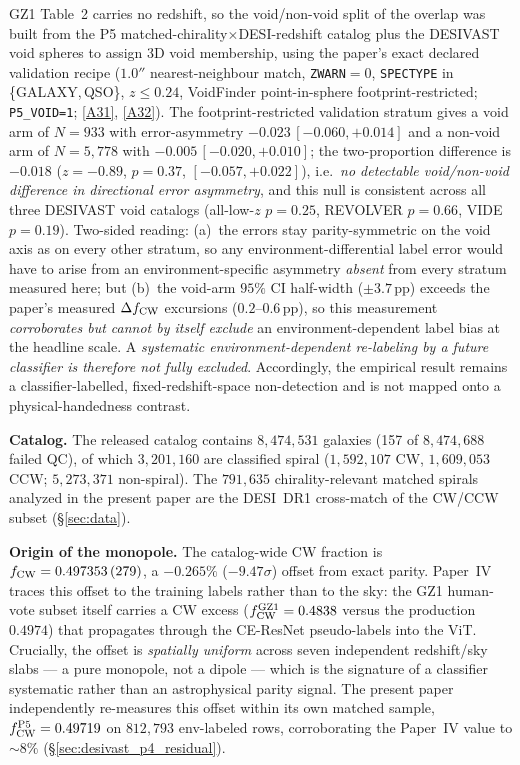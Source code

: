 \documentclass[twocolumn,linenumbers]{aastex702}
\newcommand{\repoBase}{https://github.com/Hubify-Projects/bigbounce/blob/main}
\begin{document}
GZ1 Table~2 carries no redshift, so the void/non-void split of the overlap
was built from the P5 matched-chirality$\times$DESI-redshift catalog plus the
DESIVAST void spheres to assign 3D void membership, using the paper's exact
declared validation recipe ($1.0''$ nearest-neighbour match, \texttt{ZWARN}$=0$,
\texttt{SPECTYPE} in \{GALAXY,\,QSO\}, $z\le0.24$, VoidFinder point-in-sphere
footprint-restricted; \texttt{P5\_VOID=1};
\href{\repoBase/pipelines/p2\_chirality/outputs/gz1\_stratified\_confusion.json}{[A31]},
\href{\repoBase/pipelines/p2\_chirality/scripts/gz1\_stratified\_confusion.py}{[A32]}).
The footprint-restricted validation stratum gives a void arm of $N=933$ with
error-asymmetry $-0.023\,[-0.060,+0.014]$ and a non-void arm of $N=5{,}778$
with $-0.005\,[-0.020,+0.010]$; the two-proportion difference is $-0.018$
($z=-0.89$, $p=0.37$, $[-0.057,+0.022]$), i.e.\ \emph{no detectable
void/non-void difference in directional error asymmetry}, and this null is
consistent across all three DESIVAST void catalogs (all-low-$z$ $p=0.25$,
REVOLVER $p=0.66$, VIDE $p=0.19$). Two-sided reading: (a)~the errors stay
parity-symmetric on the void axis as on every other stratum, so any
environment-differential label error would have to arise from an
environment-specific asymmetry \emph{absent} from every stratum measured
here; but (b)~the void-arm $95\%$ CI half-width ($\pm3.7$\,pp) exceeds the
paper's measured $\Delta f_{\rm CW}$ excursions ($0.2$--$0.6$\,pp), so this measurement
\emph{corroborates but cannot by itself exclude} an environment-dependent
label bias at the headline scale. A \emph{systematic
environment-dependent re-labeling by a future classifier is therefore
not fully excluded}. Accordingly, the empirical result remains a
classifier-labelled, fixed-redshift-space non-detection and is not mapped
onto a physical-handedness contrast.

\textbf{Catalog.} The released catalog contains $8{,}474{,}531$
galaxies (157 of $8{,}474{,}688$ failed QC), of which $3{,}201{,}160$
are classified spiral ($1{,}592{,}107$ CW, $1{,}609{,}053$ CCW;
$5{,}273{,}371$ non-spiral). The $791{,}635$ chirality-relevant matched
spirals analyzed in the present paper are the DESI~DR1 cross-match of
the CW/CCW subset (\S\ref{sec:data}).

\textbf{Origin of the monopole.} The catalog-wide CW fraction is
$f_{\rm CW}=0.497353\,(279)$, a $-0.265\%$ ($-9.47\sigma$) offset from
exact parity. Paper~IV traces this offset to the training labels rather
than to the sky: the GZ1 human-vote subset itself carries a CW excess
($f_{\rm CW}^{\rm GZ1}=0.4838$ versus the production $0.4974$) that
propagates through the CE-ResNet pseudo-labels into the ViT. Crucially,
the offset is \emph{spatially uniform} across seven independent
redshift/sky slabs --- a pure monopole, not a dipole --- which is the
signature of a classifier systematic rather than an astrophysical parity
signal. The present paper independently re-measures this offset within
its own matched sample, $f_{\rm CW}^{\rm P5}=0.49719$ on $812{,}793$
env-labeled rows, corroborating the Paper~IV value to ${\sim}8\%$
(\S\ref{sec:desivast_p4_residual}).
\end{document}
